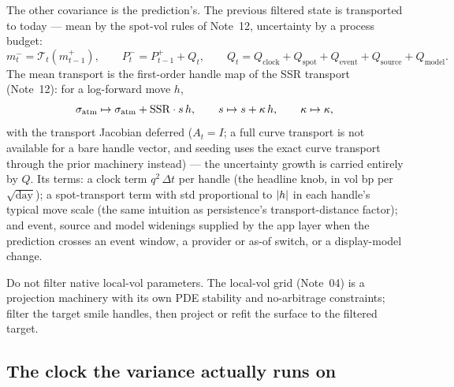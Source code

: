 \documentclass[11pt]{article}
\begin{document}
The other covariance is the prediction's.  The previous filtered state
is transported to today --- mean by the spot-vol rules of Note~12,
uncertainty by a process budget:
\begin{equation}
m_t^-=\mathcal T_t(m_{t-1}^+),
\qquad
P_t^-=P_{t-1}^++Q_t,
\qquad
Q_t=Q_{\mathrm{clock}}+Q_{\mathrm{spot}}
+Q_{\mathrm{event}}+Q_{\mathrm{source}}+Q_{\mathrm{model}} .
\label{eq:transport}
\end{equation}
The mean transport is the first-order handle map of the SSR transport
(Note~12): for a log-forward move $h$,
\begin{equation}
\sigma_{\mathrm{atm}}\mapsto\sigma_{\mathrm{atm}}+\mathrm{SSR}\cdot s\,h,
\qquad
s\mapsto s+\kappa\,h,
\qquad
\kappa\mapsto\kappa,
\label{eq:transport-handles}
\end{equation}
with the transport Jacobian deferred ($A_t=I$; a full curve transport is
not available for a bare handle vector, and seeding uses the exact curve
transport through the prior machinery instead) --- the uncertainty
growth is carried entirely by $Q$.  Its terms: a clock term
$q^2\,\Delta t$ per handle (the headline knob, in vol bp per
$\sqrt{\text{day}}$); a spot-transport term with std proportional to
$\lvert h\rvert$ in each handle's typical move scale (the same intuition as
persistence's transport-distance factor); and event, source and model
widenings supplied by the app layer when the prediction crosses an event
window, a provider or as-of switch, or a display-model change.

\begin{caution}
Do not filter native local-vol parameters.  The local-vol grid
(Note~04) is a projection machinery with its own PDE stability and
no-arbitrage constraints; filter the target smile handles, then project
or refit the surface to the filtered target.
\end{caution}

\subsection{The clock the variance actually runs on}
\label{sec:clock}
\end{document}
